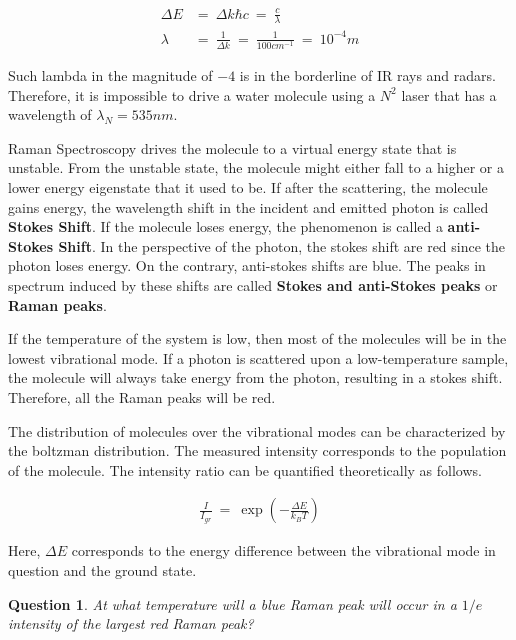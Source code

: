 \documentclass[10pt]{article}
\numberwithin{equation}{section}
\newtheorem{question}{Question}
\numberwithin{theorem}{section}
\numberwithin{proposition}{section}
\numberwithin{lemma}{section}
\numberwithin{corollary}{section}
\numberwithin{remark}{section}
\numberwithin{definition}{section}
\numberwithin{example}{section}
\numberwithin{conjecture}{section}
\numberwithin{question}{section}
\begin{document}
\begin{align}
    \Delta E & = \ \Delta k \hbar c \ = \ \frac c {\lambda} \\ 
    \lambda & = \ \frac 1 {\Delta k} \ = \ \frac 1 {100 cm^{-1}} \ = \ 10^{-4} m
\end{align}

Such lambda in the magnitude of $-4$ is in the borderline of IR rays 
and radars. Therefore, it is impossible to drive a water molecule using 
a $N^2$ laser that has a wavelength of $\lambda_N = 535nm$. 

Raman Spectroscopy drives the molecule to a virtual energy state 
that is unstable. From the unstable state, the molecule might either 
fall to a higher or a lower energy eigenstate that it used to be. 
If after the scattering, the molecule gains energy, the wavelength shift in the incident 
and emitted photon is called \textbf{Stokes Shift}. If the molecule 
loses energy, the phenomenon is called a \textbf{anti-Stokes Shift}. 
In the perspective of the photon, the stokes shift are red since the 
photon loses energy. On the contrary, anti-stokes shifts are blue. 
The peaks in spectrum induced by these shifts are called \textbf{
    Stokes and anti-Stokes peaks
} or \textbf{Raman peaks}. 

If the temperature of the system is low, then most of the molecules 
will be in the lowest vibrational mode. If a photon is scattered 
upon a low-temperature sample, the molecule will always take energy 
from the photon, resulting in a stokes shift. Therefore, all 
the Raman peaks will be red. 

The distribution of molecules over the vibrational modes can 
be characterized by the boltzman distribution. The measured 
intensity corresponds to the population of the molecule. The 
intensity ratio can be quantified theoretically as follows. 

\begin{align}
    \frac {I} {I_{gr}} \ = \ \exp\left(
        -\frac {\Delta E}{k_B T}
    \right)
\end{align}

Here, $\Delta E$ corresponds to the energy difference between 
the vibrational mode in question and the ground state. 

\begin{question}
    At what temperature will a blue Raman peak will occur 
    in a $1/e$ intensity of the largest red Raman peak?
\end{question}
\end{document}
